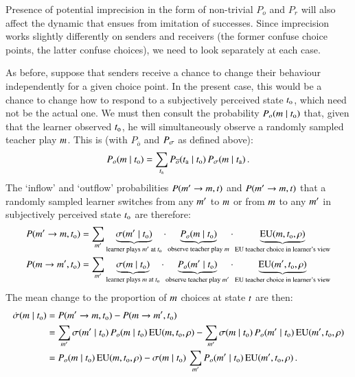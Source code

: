 \documentclass[11pt,english]{article}
\numberwithin{equation}{section}
\begin{document}
\begin{appendices}
Presence of potential imprecision in the form of non-trivial $P_o$ and $P_r$ will also affect
the dynamic that ensues from imitation of successes. Since imprecision works slightly
differently on senders and receivers (the former confuse choice points, the latter confuse
choices), we need to look separately at each case.

As before, suppose that senders receive a chance to change their behaviour independently for a
given choice point. In the present case, this would be a chance to change how to respond to a
subjectively perceived state $t_{\mathrm{o}}$, which need not be the actual one. We must then
consult the probability $P_o(m \mid t_{\mathrm{o}})$ that, given that the learner
observed $t_{\mathrm{o}}$, he will simultaneously observe a randomly sampled teacher play
$m$. This is (with $P_{\overline{o}}$ and $P_{\sigma}$ as defined above):
\begin{align*}
  P_o(m \mid t_{\mathrm{o}}) = \sum_{t_{\mathrm{a}}} P_{\overline{o}}(t_{\mathrm{a}}
  \mid t_{\mathrm{o}}) \thinspace P_{\sigma}(m \mid t_{\mathrm{a}})\,.
\end{align*}
The `inflow' and `outflow' probabilities $P(m' \rightarrow m, t)$ and
$P(m' \rightarrow m, t)$ that a randomly sampled learner switches from any
$m'$ to $m$ or from $m$ to any $m'$ in subjectively perceived state
$t_{\mathrm{o}}$ are therefore:
\begin{align*}
  P(m' \rightarrow m, t_{\mathrm{o}}) & = \sum_{m'} \underbrace{\sigma(m' \mid
    t_{\mathrm{o}})}_{\text{learner plays $m'$ at $t_{\mathrm{o}}$}} \cdot
  \underbrace{P_{o}(m \mid t_{\mathrm{o}})}_{\text{observe teacher play $m$}} \cdot
  \underbrace{\mathrm{EU}(m, t_{\mathrm{o}}, \rho)}_{\text{EU teacher choice in learner's view}}
  \\
  P(m \rightarrow m', t_{\mathrm{o}}) & = \sum_{m'} \underbrace{\sigma(m \mid
    t_{\mathrm{o}})}_{\text{learner plays $m$ at $t_{\mathrm{o}}$}} \cdot
  \underbrace{P_{o}(m' \mid t_{\mathrm{o}})}_{\text{observe teacher play $m'$}} \cdot
  \underbrace{\mathrm{EU}(m', t_{\mathrm{o}}, \rho)}_{\text{EU teacher choice in learner's view}}
\end{align*}
The mean change to the proportion of $m$ choices at state $t$ are then:
\begin{align}
  \label{eq:nRDSender}
  \dot{\sigma}(m \mid t_{\mathrm{o}}) & = P(m' \rightarrow m, t_{\mathrm{o}}) - P(m
  \rightarrow m', t_{\mathrm{o}}) \nonumber \\
  & = \sum_{m'} \sigma(m' \mid t_{\mathrm{o}}) \thinspace P_o(m \mid
  t_{\mathrm{o}}) \thinspace \mathrm{EU}(m, t_{\mathrm{o}}, \rho) - \sum_{m'} \sigma(m \mid t_{\mathrm{o}}) \thinspace
  P_o(m' \mid t_{\mathrm{o}}) \thinspace \mathrm{EU}(m', t_{\mathrm{o}}, \rho) \nonumber \\
  & = P_o(m \mid t_{\mathrm{o}}) \thinspace \mathrm{EU}(m, t_{\mathrm{o}}, \rho) - \sigma(m \mid t_{\mathrm{o}}) \thinspace \sum_{m'} P_o(m' \mid t_{\mathrm{o}}) \thinspace \mathrm{EU}(m', t_{\mathrm{o}}, \rho)\,.
\end{align}



\end{appendices}
\end{document}
